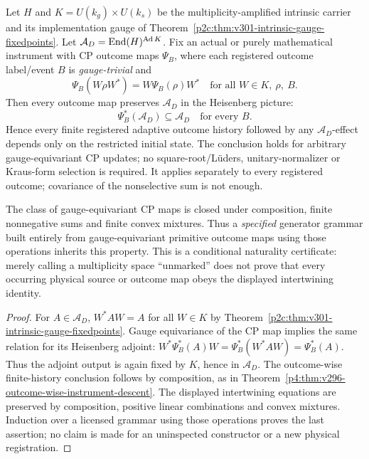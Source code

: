 \documentclass[12pt,a4paper]{article}
\begin{document}
\begin{theorem}
\label{p4a:thm:v301-gauge-natural-instrument-descent}
Let $H$ and $K=U(k_g)\times U(k_s)$ be the multiplicity-amplified
intrinsic carrier and its implementation gauge of
Theorem~\ref{p2c:thm:v301-intrinsic-gauge-fixedpoints}. Let
$\mathcal A_D=\operatorname{End}(H)^{\operatorname{Ad}K}$. Fix an actual or purely
mathematical instrument with CP outcome maps $\Psi_B$, where each
registered outcome label/event $B$ is \emph{gauge-trivial} and
\[
 \Psi_B(W\rho W^*)=W\Psi_B(\rho)W^*
 \quad\text{for all }W\in K,\ \rho,\ B.
\]
Then every outcome map preserves $\mathcal A_D$ in the Heisenberg
picture:
\[
 \boxed{\ \Psi_B^*(\mathcal A_D)\subseteq\mathcal A_D
 \quad\text{for every }B.\ }
\]
Hence every finite registered adaptive outcome history followed by
any $\mathcal A_D$-effect depends only on the restricted initial
state. The conclusion holds for arbitrary gauge-equivariant CP
updates; no square-root/L\"uders, unitary-normalizer or Kraus-form
selection is required. It applies separately to every registered
outcome; covariance of the nonselective sum is not enough.

The class of gauge-equivariant CP maps is closed under composition,
finite nonnegative sums and finite convex mixtures. Thus a
\emph{specified} generator grammar built entirely from gauge-equivariant
primitive outcome maps using those operations inherits this
property. This is a conditional naturality certificate: merely
calling a multiplicity space ``unmarked'' does not prove that every
occurring physical source or outcome map obeys the displayed
intertwining identity.
\end{theorem}
\begin{proof}
For $A\in\mathcal A_D$, $W^*AW=A$ for all $W\in K$ by
Theorem~\ref{p2c:thm:v301-intrinsic-gauge-fixedpoints}. Gauge
equivariance of the CP map implies the same relation for its
Heisenberg adjoint: $W^*\Psi_B^*(A)W=\Psi_B^*(W^*AW)=\Psi_B^*(A)$.
Thus the adjoint output is again fixed by $K$, hence in $\mathcal
A_D$. The outcome-wise finite-history conclusion follows by
composition, as in
Theorem~\ref{p4:thm:v296-outcome-wise-instrument-descent}.
The displayed intertwining equations are preserved by composition,
positive linear combinations and convex mixtures. Induction over
a licensed grammar using those operations proves the last assertion;
no claim is made for an uninspected constructor or a new
physical registration.
\end{proof}
\end{document}

